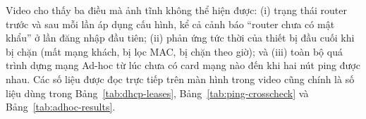 Video cho thấy ba điều mà ảnh tĩnh không thể hiện được: (i) trạng thái router
trước và sau mỗi lần áp dụng cấu hình, kể cả cảnh báo ``router chưa có mật
khẩu'' ở lần đăng nhập đầu tiên; (ii) phản ứng tức thời của thiết bị đầu cuối
khi bị chặn (mất mạng khách, bị lọc MAC, bị chặn theo giờ); và (iii) toàn bộ
quá trình dựng mạng Ad-hoc từ lúc chưa có card mạng nào đến khi hai nút ping được
nhau. Các số liệu được đọc trực tiếp trên màn hình trong video cũng chính là số
liệu dùng trong Bảng~\ref{tab:dhcp-leases},
Bảng~\ref{tab:ping-crosscheck} và Bảng~\ref{tab:adhoc-results}.

\endgroup
